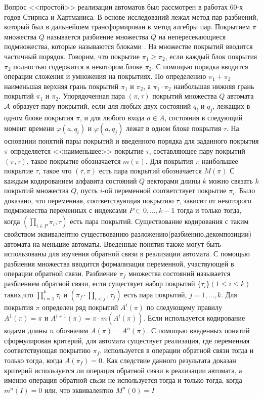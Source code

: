 Вопрос <<простой>> реализации автоматов был рассмотрен в работах 60-х годов Стирнса и Хартманиса. В основе исследований лежал метод пар разбиений, который был в дальнейшем трансформирован в метод алгебры пар. Покрытием $\pi$ множества $Q$ называется разбиение множества $Q$ на непересекающиеся подмножества, которые называются блоками \cite{hartmanis_stearns_feedback_en}. На множестве покрытий вводится частичный порядок. Говорим, что покрытие $\pi_1\ge\pi_2$, если каждый блок покрытия $\pi_2$ полностью содержится в некотором блоке $\pi_2$. С помощью порядка вводится операции сложения и умножения на покрытиях. По определению $\pi_1+\pi_2$ наименьшая верхняя грань покрытий $\pi_1$ и $\pi_2$, а $\pi_1\cdot\pi_2$ наибольшая нижняя грань покрытий $\pi_1$ и $\pi_2$. Упорядоченная пара $(\pi,\tau)$ покрытий множества $Q$ автомата ${\cal A}$ образует пару покрытий, если для любых двух состояний $q_i$ и $q_j$, лежащих в одном блоке покрытия $\pi$, и для любого входа $a\in A$, состояния в следующий момент времени $\varphi(a,q_i)$ и $\varphi(a,q_j)$ лежат в одном блоке покрытия $\tau$. На основании понятий пары покрытий и введенного порядка для заданного покрытия $\pi$ определяется <<наименьшее>> покрытие $\tau$, составляющее пару покрытий $(\pi, \tau)$, такое покрытие обозначается $m(\pi)$. Для покрытия $\pi$ наибольшее покрытие $\tau$, такое что $(\tau,\pi)$ есть пара покрытий обозначается $M(\pi)$
С каждым кодированием алфавита состояний $Q$ векторами длины $k$ можно связать $k$ покрытий множества $Q$, пусть $i$-ой переменной соответствует покрытие $\pi_i$. Было доказано, что переменная, соответствующая покрытию $\tau$, зависит от некоторого подмножества переменных с индексами $P\subset {0,\ldots,k-1}$ тогда и только тогда, когда $(\prod_{i\in P}\pi_i,\tau)$ есть пара покрытий. Существование кодирования с таким свойством эквивалентно существованию разложению(разбиению,декомпозиции) автомата на меньшие автоматы.
Введенные понятия также могут быть использованы для изучения обратной связи в реализации автомата. С помощью разбиения множества вводится формализация переменной, участвующей в операции обратной связи. Разбиение $\pi_f$ множества состояний называется разбиением обратной связи, если существует набор покрытий $\{\tau_i\}(1\le i\le k)$ таких,что $\prod_{i=1}^k\tau_i$ и $(\pi_f\cdot\prod_{i<j},\tau_j)$ есть пара покрытий, $j=1,\ldots,k$. Для покрытия $\pi$ определен ряд покрытий $A^i(\pi)$ по следующему правилу $A^1(\pi)=\pi$ и $A^{i+1}(\pi)=\pi\cdot m(A^i(\pi))$. Если используется кодирование кодами длины $n$ обозначим $A(\pi)=A^n(\pi)$. С помощью введенных понятий сформулирован критерий, для автомата существует реализация, где переменная соответствующая покрытию $\pi_f$, используется в операции обратной связи тогда и только тогда, когда $A(\pi_f)=0$.
Как следствие данного результата доказан критерий используется ли операция обратной связи в реализации автомата, а именно операция обратной свzзи не используется тогда и только тогда, когда $m^n(I)=0$ или, что эквивалентно $M^n(0)=I$

